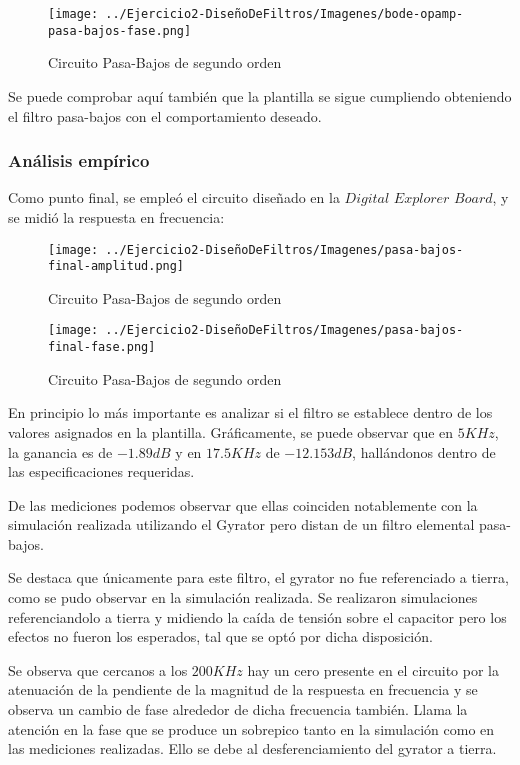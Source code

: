 \begin{figure}[H]
    \centering
    \texttt{[image: ../Ejercicio2-DiseñoDeFiltros/Imagenes/bode-opamp-pasa-bajos-fase.png]}
    \caption{Circuito Pasa-Bajos de segundo orden}
\end{figure}

Se puede comprobar aquí también que la plantilla se sigue cumpliendo obteniendo el filtro pasa-bajos con el comportamiento deseado.

\subsubsection{Análisis empírico}

Como punto final, se empleó el circuito diseñado en la $Digital$ $Explorer$ $Board$, y se midió la respuesta en frecuencia:

\begin{figure}[H]
    \centering
    \texttt{[image: ../Ejercicio2-DiseñoDeFiltros/Imagenes/pasa-bajos-final-amplitud.png]}
    \caption{Circuito Pasa-Bajos de segundo orden}
\end{figure}

\begin{figure}[H]
    \centering
    \texttt{[image: ../Ejercicio2-DiseñoDeFiltros/Imagenes/pasa-bajos-final-fase.png]}
    \caption{Circuito Pasa-Bajos de segundo orden}
\end{figure}


En principio lo más importante es analizar si el filtro se establece dentro de los valores asignados en la plantilla. Gráficamente, se puede observar
que en $5 KHz$, la ganancia es de $-1.89 dB$ y en $17.5 KHz$ de $-12.153 dB$, hallándonos dentro de las especificaciones requeridas.

De las mediciones podemos observar que ellas coinciden notablemente con la simulación realizada utilizando el Gyrator pero distan de un filtro elemental pasa-bajos.


Se destaca que únicamente para este filtro, el gyrator no fue referenciado a tierra, como se pudo observar en la simulación realizada. Se realizaron simulaciones referenciandolo a tierra y midiendo la caída de tensión
sobre el capacitor pero los efectos no fueron los esperados, tal que se optó por dicha disposición.

Se observa que cercanos a los $200KHz$ hay un cero presente en el circuito por la atenuación de la pendiente de la magnitud de la respuesta en frecuencia y se observa
un cambio de fase alrededor de dicha frecuencia también. Llama la atención en la fase que se produce un sobrepico tanto en la simulación como en las mediciones realizadas.
Ello se debe al desferenciamiento del gyrator a tierra.

